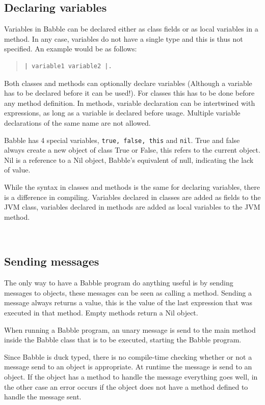 \documentclass[a4paper]{article}
\begin{document}
\subsection{Declaring variables}
Variables in Babble can be declared either as class fields or as local variables in a method. In any case, variables do not have a single type and this is thus not specified. An example would be as follows:
\begin{quote}
\begin{lstlisting}
| variable1 variable2 |.
\end{lstlisting}
\end{quote}

Both classes and methods can optionally declare variables (Although a variable has to be declared before it can be used!). For classes this has to be done before any method definition. In methods, variable declaration can be intertwined with expressions, as long as a variable is declared before usage. Multiple variable declarations of the same name are not allowed.

Babble has 4 special variables, \verb|true, false, this| and \verb|nil|. True and false always create a new object of class True or False, this refers to the current object. Nil is a reference to a Nil object, Babble's equivalent of null, indicating the lack of value.

While the syntax in classes and methods is the same for declaring variables, there is a difference in compiling. Variables declared in classes are added as fields to the JVM class, variables declared in methods are added as local variables to the JVM method.

\

\subsection{Sending messages}

The only way to have a Babble program do anything useful is by sending messages to objects, these messages can be seen as calling a method. Sending a message always returns a value, this is the value of the last expression that was executed in that method. Empty methods return a Nil object.

When running a Babble program, an unary message is send to the main method inside the Babble class that is to be executed, starting the Babble program.

Since Babble is duck typed, there is no compile-time checking whether or not a message send to an object is appropriate. At runtime the message is send to an object. If the object has a method to handle the message everything goes well, in the other case an error occurs if the object does not have a method defined to handle the message sent.
\end{document}
